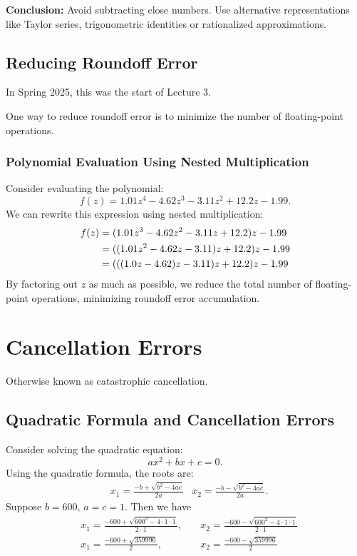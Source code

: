 \textbf{Conclusion:} Avoid subtracting close numbers. Use alternative 
representations like Taylor series, trigonometric identities or rationalized 
approximations.

\subsection{Reducing Roundoff Error}
\begin{greenquote}
  In Spring 2025, this was the start of Lecture 3.
\end{greenquote}

One way to reduce roundoff error is to minimize the number of floating-point 
operations.

\subsubsection{Polynomial Evaluation Using Nested Multiplication}

Consider evaluating the polynomial:
\begin{equation*}
    f(z) = 1.01z^4 - 4.62z^3 - 3.11z^2 + 12.2z - 1.99.
\end{equation*}
We can rewrite this expression using nested multiplication:
\begin{align*}
    f(z) &= (1.01z^3 - 4.62z^2 - 3.11z + 12.2)z - 1.99 \\
         &= ((1.01z^2 - 4.62z - 3.11)z + 12.2)z - 1.99 \\
         &= \pqty{
           \pqty{
             \pqty{
               1.0z - 4.62
             }z - 3.11
           }z + 12.2
         }z - 1.99 \\
\end{align*}
By factoring out $z$ as much as possible, we reduce the total number of 
floating-point operations, minimizing roundoff error accumulation.

\section{Cancellation Errors}
Otherwise known as catastrophic cancellation.

\subsection{Quadratic Formula and Cancellation Errors}

Consider solving the quadratic equation:
\begin{equation*}
    ax^2 + bx + c = 0.
\end{equation*}
Using the quadratic formula, the roots are:
\begin{align*}
    &x_1 = \frac{-b + \sqrt{b^2 - 4ac}}{2a}
    &x_2 = \frac{-b - \sqrt{b^2 - 4ac}}{2a}.
\end{align*}
Suppose $b = 600$, $a = c = 1$. Then we have
\begin{align*}
  &x_1 = \frac{-600 + \sqrt{600^2 - 4 \cdot 1 \cdot 1}}{2 \cdot 1}, \quad
  &x_2 = \frac{-600 - \sqrt{600^2 - 4 \cdot 1 \cdot 1}}{2 \cdot 1} \\
  &x_1 = \frac{-600 + \sqrt{359996}}{2}, 
  &x_2 = \frac{-600 - \sqrt{359996}}{2}
\end{align*}

